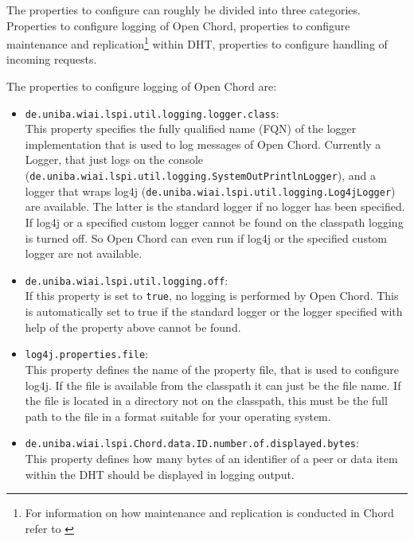 The properties to configure can roughly be divided into three categories. Properties 
to configure logging of Open Chord, properties to configure maintenance and replication\footnote{For information on how maintenance and replication is conducted 
in Chord refer to \cite{stoica01chord}} within DHT, properties to configure handling 
of incoming requests. 

The properties to configure logging of Open Chord are: 
\begin{itemize}
\item {\tt de.uniba.wiai.lspi.util.logging.logger.class}:\\ 
This property specifies the 
fully qualified name (FQN) of the logger implementation that is used to log messages 
of Open Chord. Currently a Logger, that just logs on the console ({\tt de.\-uniba.\-wiai.\-lspi.\-util.\-logging.\-SystemOutPrintlnLogger}), and a logger that wraps 
log4j ({\tt de.\-uniba.\-wiai.\-lspi.\-util.\-log\-ging.\-Log4jLogger}) are available. The latter 
is the standard logger if no logger has been specified. If log4j or a specified custom logger cannot be found on the classpath logging is turned off. So Open Chord can even run if log4j or the specified custom logger are not available. 
\item {\tt de.uniba.wiai.lspi.util.logging.off}:\\ 
If this property is set to {\tt true}, 
no logging is performed by Open Chord. This is automatically set to true if the
standard logger or the logger specified with help of the property above cannot be 
found. 
\item {\tt log4j.properties.file}:\\ 
This property defines the name of the property file, 
that is used to configure log4j. If the file is available from the classpath it can just be the file name. If the file is located in a directory not on the classpath, this 
must be the full path to the file in a format suitable for your operating system. 
\item 
{\tt de.\-uniba.\-wiai.\-lspi.\-Chord.\-data.\-ID.\-number.\-of.\-displayed.\-bytes}:\\
This property defines how many bytes of an identifier of a peer or data item within 
the DHT should be displayed in logging output. 
\end{itemize} 

